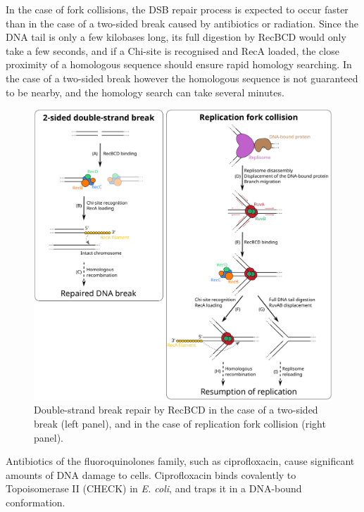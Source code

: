 In the case of fork collisions, the DSB repair process is expected to occur faster than in the case of a two-sided break caused by antibiotics or radiation. Since the DNA tail is only a few kilobases long, its full digestion by RecBCD would only take a few seconds, and if a Chi-site is recognised and RecA loaded, the close proximity of a homologous sequence should ensure rapid homology searching. In the case of a two-sided break however the homologous sequence is not guaranteed to be nearby, and the homology search can take several minutes.\cite{Wiktor2021}

\begin{figure}[htbp]
    \centering
    \includegraphics[width=.8\textwidth]{Figures/DSB_scheme.pdf}
    \caption{Double-strand break repair by RecBCD in the case of a two-sided break (left panel), and in the case of replication fork collision (right panel).}
    \label{Fig:DSB_scheme}
\end{figure}

Antibiotics of the fluoro\-quinolones family, such as cipro\-flox\-acin, cause significant amounts of DNA damage to cells. Ciprofloxacin binds covalently to Topoisomerase II (CHECK) in \emph{E. coli}, and traps it in a DNA-bound conformation.





